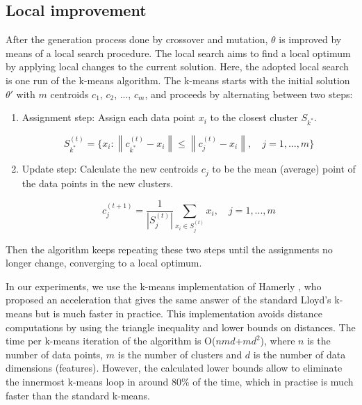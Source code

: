 \subsection{Local improvement}
After the generation process done by crossover and mutation, $\theta$ is improved by means of a local search procedure. The local search aims to find a local optimum by applying local changes to the current solution. Here, the adopted local search is one run of the k-means algorithm. The k-means starts with the initial solution $\theta'$ with $m$ centroids $c_1$, $c_2$, ..., $c_m$, and proceeds by alternating between two steps:

\begin{enumerate}

	\item Assignment step: Assign each data point $x_i$ to the closest cluster $S_{k^{*}}$.
	
	\begin{equation}
	S_{k^{*}}^{(t)} = \{ x_i: \left \| c_{k^{*}}^{(t)} - x_i \right \| \leq  \left \| c_{j}^{(t)} - x_i \right \|, \quad j = 1, ..., m \}
	\end{equation}
	
	\item Update step: Calculate the new centroids $c_j$ to be the mean (average) point of the data points in the new clusters.
	
	\begin{equation}
	c_{j}^{(t+1)} = \frac{1}{\left | S_{j}^{(t)} \right |} \sum_{x_i \in S_{j}^{(t)}} x_i, \quad j = 1, ..., m
	\end{equation}
		
\end{enumerate}

Then the algorithm keeps repeating these two steps until the assignments no longer change, converging to a local optimum.

In our experiments, we use the k-means implementation of Hamerly \cite{Hamerly2010}, who proposed an acceleration that gives the same answer of the standard Lloyd's k-means \cite{Lloyd1982} but is much faster in practice. This implementation avoids distance computations by using the triangle inequality and lower bounds on distances. The time per k-means iteration of the algorithm is O($nmd$+$md^2$), where $n$ is the number of data points, $m$ is the number of clusters and $d$ is the number of data dimensions (features). However, the calculated lower bounds allow to eliminate the innermost k-means loop in around 80\% of the time, which in practise is much faster than the standard k-means.

